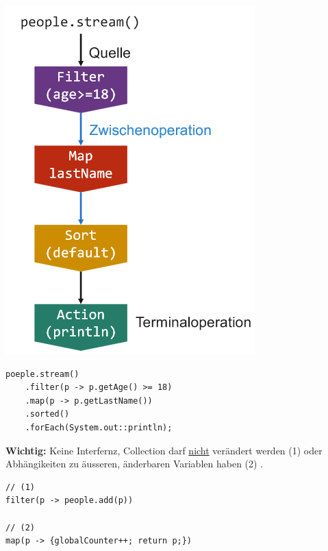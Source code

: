 \begin{center}
	\begin{minipage}{0.2\textwidth}
		\includegraphics[width=\columnwidth,keepaspectratio=true]{Images/stream}
	\end{minipage}%
	\begin{minipage}{0.3\textwidth}
		\begin{lstlisting}
poeple.stream()
	.filter(p -> p.getAge() >= 18)
	.map(p -> p.getLastName())
	.sorted()
	.forEach(System.out::println);
		\end{lstlisting}
	\end{minipage}
\end{center}

\noindent\textbf{Wichtig:} Keine Interfernz, Collection darf \underline{nicht} verändert werden (1) oder Abhängikeiten zu äusseren, änderbaren Variablen haben (2) .
\begin{lstlisting}
// (1)
filter(p -> people.add(p))	
			
// (2)			
map(p -> {globalCounter++; return p;})	
\end{lstlisting}

